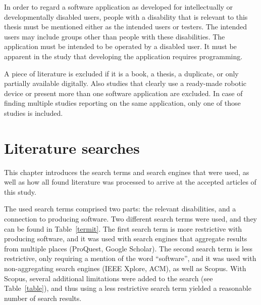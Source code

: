 \documentclass[utf8,english]{gradu3}
\begin{document}
In order to regard a software application as developed for intellectually or developmentally disabled users,
people with a disability that is relevant to this thesis must be mentioned either as the intended
users or testers. The intended users may include groups other than people with these disabilities.
The application must be intended to be operated by a disabled user.
It must be apparent in the study that developing the application requires programming.

A piece of literature is excluded if it is a book, a thesis, a duplicate, or only partially available digitally.
Also studies that clearly use a ready-made robotic device or present more than one software application are excluded.
In case of finding multiple studies reporting on the same application, only one of those studies is included.

\section{Literature searches} \label{searches}

This chapter introduces the search terms and search engines that were used,
as well as how all found literature was processed to arrive at the accepted articles of this study.

The used search terms comprised two parts: the relevant disabilities, and a connection to producing software.
Two different search terms were used, and they can be found in Table~\ref{termit}.
The first search term is more restrictive with producing software,
and it was used with search engines that aggregate results from multiple places (ProQuest, Google Scholar).
The second search term is less restrictive, only requiring a mention of the word ``software'',
and it was used with non-aggregating search engines (IEEE Xplore, ACM), as well as Scopus.
With Scopus, several additional limitations were added to the search (see Table~\ref{table}),
and thus using a less restrictive search term yielded a reasonable number of search results.
\end{document}
